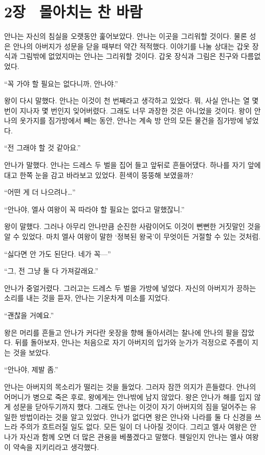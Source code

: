 \chapter[2장  몰아치는 찬 바람][2장\hspace*{.5em}몰아치는 찬 바람]{2장 \ 몰아치는 찬 바람}



안나는 자신의 침실을 오랫동안 훑어보았다. 안나는 이곳을 그리워할 것이다. 물론 성은 안나의 아버지가 성문을 닫을 때부터 약간 적적했다. 이야기를 나눌 상대는 갑옷 장식과 그림밖에 없었지마는 안나는 그리워할 것이다. 갑옷 장식과 그림은 친구와 다름없었다.

``꼭 가야 할 필요는 없다니까, 안나야.''

왕이 다시 말했다. 안나는 이것이 천 번째라고 생각하고 있었다. 뭐, 사실 안나는 열 몇 번이 지나자 몇 번인지 잊어버렸다. 그래도 너무 과장한 것은 아니었을 것이다. 왕이 안나의 옷가지를 짐가방에서 빼는 동안, 안나는 계속 방 안의 모든 물건을 짐가방에 넣었다.

``전 그래야 할 것 같아요.''

안나가 말했다. 안나는 드레스 두 벌을 집어 들고 앞뒤로 흔들어댔다. 하나를 자기 앞에 대고 한쪽 눈을 감고 바라보고 있었다. 흰색이 뚱뚱해 보였을까?

``어떤 게 더 나으려나\ldots''

``안나야, 엘사 여왕이 꼭 따라야 할 필요는 없다고 말했잖니.''

왕이 말했다. 그러나 아무리 안나만큼 순진한 사람이어도 이것이 뻔뻔한 거짓말인 것을 알 수 있었다. 마치 엘사 여왕이 말한 `정복된 왕국'이 무엇이든 거절할 수 있는 것처럼.

``싫다면 안 가도 된단다. 네가 꼭—''

``그, 전 그냥 둘 다 가져갈래요.''

안나가 중얼거렸다. 그러고는 드레스 두 벌을 가방에 넣었다. 자신의 아버지가 끙하는 소리를 내는 것을 듣자, 안나는 기운차게 미소를 지었다.

``괜찮을 거예요.''

왕은 머리를 흔들고 안나가 커다란 옷장을 향해 돌아서려는 찰나에 안나의 팔을 잡았다. 뒤를 돌아보자, 안나는 처음으로 자기 아버지의 입가와 눈가가 걱정으로 주름이 지는 것을 보았다.

``안나야, 제발 좀.''

안나는 아버지의 목소리가 떨리는 것을 들었다. 그러자 잠깐 의지가 흔들렸다. 안나의 어머니가 병으로 죽은 후로, 왕에게는 안나밖에 남지 않았다. 왕은 안나가 해를 입지 않게 성문을 닫아두기까지 했다. 그래도 안나는 이것이 자기 아버지의 짐을 덜어주는 유일한 방법이라는 것을 알고 있었다. 안나가 없다면 왕은 안나와 나라를 둘 다 신경을 쓰느라 주의가 흐트러질 일도 없다.  모든 일이 더 나아질 것이다. 그리고 엘사 여왕은 안나가 자신과 함께 오면 더 많은 관용을 베풀겠다고 말했다. 웬일인지 안나는 엘사 여왕이 약속을 지키리라고 생각했다.

